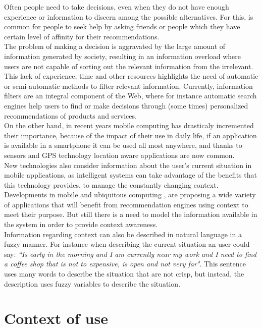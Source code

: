 Often people need to take decisions, even when they do not
have enough experience or information to discern among 
the possible alternatives. For this, is common for people to 
seek help by asking friends  or people which they  
have certain level of affinity for their recommendations.\\
The problem of making a decision is aggravated by the 
large amount of information generated by society, 
resulting in an information overload where users are not capable of
sorting out the relevant information from the irrelevant.
This lack of experience, time and other resources 
highlights the need of automatic or semi-automatic methods 
to filter relevant information. Currently, information filters are
an integral component of the Web, where for instance
automatic search engines help users to find or make 
decisions through (some times) personalized recommendations
of products and services. \\ On the other hand, in recent
years  mobile computing has drasticaly incremented their importance, 
because of the impact of their use in daily life, if an application 
is available in a smartphone it can be used all most anywhere, and thanks
to sensors and GPS technology location aware applications are now common.\\ 
New technologies also consider information about the user's current situation 
in mobile applications, as intelligent systems can take advantage of the
benefits that this technology provides, to manage the constantly changing 
context. \\ Developments in mobile and ubiquitous computing \cite{noguera2012mobile} 
\cite{chiou2010adaptive}, are proposing a wide variety of applications
that will benefit from recommendation engines using context to meet their
purpose. But still there is a need to model the information available in
the system in order to provide context awareness.\\  Information regarding 
context can also be described in natural language in a fuzzy manner. For
instance when describing the current situation an user could say: \textit{``Is early in
the morning and I am currently near my work and I need to find a coffee
shop that is not to expensive, is open and not very far"}.
This sentence uses many words to describe the situation that are not 
crisp, but instead, the description uses fuzzy variables to describe the situation.  

\section{Context of use}\label{contextofuse}

